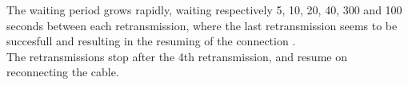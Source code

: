 The waiting period grows rapidly, waiting respectively 5, 10, 20, 40, 300 and 100 seconds between each retransmission, where the last retransmission seems to be succesfull and resulting in the resuming of the connection .\\
The retransmissions stop after the 4th retransmission, and resume on reconnecting the cable.